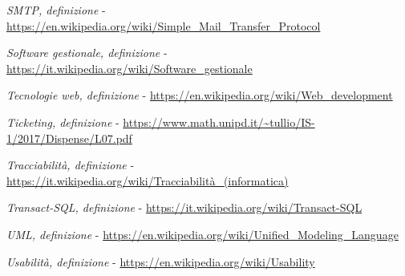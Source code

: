 \begin{enumerate}[label={[\arabic*]}]
	\item \textit{SMTP, definizione} - \url{https://en.wikipedia.org/wiki/Simple_Mail_Transfer_Protocol} 
	\item \textit{Software gestionale, definizione} - \url{https://it.wikipedia.org/wiki/Software_gestionale}
	\item \textit{Tecnologie web, definizione} - \url{https://en.wikipedia.org/wiki/Web_development}
	\item \textit{Ticketing, definizione} - \url{https://www.math.unipd.it/~tullio/IS-1/2017/Dispense/L07.pdf}
	\item \textit{Tracciabilità, definizione} - \url{https://it.wikipedia.org/wiki/Tracciabilità_(informatica)} 
	\item \textit{Transact-SQL, definizione} - \url{https://it.wikipedia.org/wiki/Transact-SQL} 
	\item \textit{UML, definizione} - \url{https://en.wikipedia.org/wiki/Unified_Modeling_Language} 
	\item \textit{Usabilità, definizione} - \url{https://en.wikipedia.org/wiki/Usability}
\end{enumerate}
